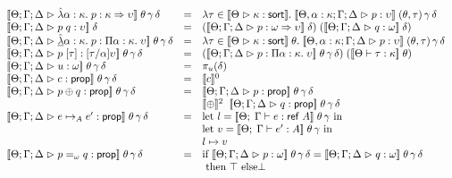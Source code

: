 \begin{figure}
\begin{displaymath}
\begin{array}{lcl}
\interp{\judgeA{\pfun{\alpha}{\kappa}{p}}{\kappa \To \upsilon}}\;\theta\,\gamma\,\delta & = & 
   \semfun{\tau \in \interp{\judgeSort{\kappa}}}
          {\interp{\judgeA[\Theta, \alpha:\kappa;\Gamma;\Delta]{p}{\upsilon}}\;(\theta,\tau)\,\gamma\,\delta} \\

\interp{\judgeA{p\;q}{\upsilon}}\;\delta & = & 
   (\interp{\judgeA{p}{\omega \To \upsilon}}\;\delta)\;(\interp{\judgeA{q}{\omega}}\;\delta) \\

\interp{\judgeA{\pfunall{\alpha}{\kappa}{p}}{\forallsort{\alpha}{\kappa}{\upsilon}}}\;\theta\,\gamma\,\delta & = &
   \semfun{\tau \in \interp{\judgeSort{\kappa}}\;\theta}
          {\interp{\judgeA[\Theta, \alpha:\kappa; \Gamma; \Delta]{p}{\upsilon}}\;(\theta,\tau)\,\gamma\,\delta}
\\
\interp{\judgeA{p\;[\tau]}{[\tau/\alpha]\upsilon}}\;\theta\,\gamma\,\delta & = & 
   (\interp{\judgeA{p}{\forallsort{\alpha}{\kappa}{\upsilon}}}\;\theta\,\gamma\,\delta)\;
   (\interp{\judgeWK{\tau}{\kappa}}\;\theta) \\


\interp{\judgeA{u}{\omega}}\;\theta\,\gamma\,\delta & = & \pi_u(\delta) \\

\interp{\judgeA{c}{\assert}}\;\theta\,\gamma\,\delta & = & \interp{c}^0 \\

\interp{\judgeA{p \oplus q}{\assert}}\;\theta\,\gamma\,\delta & = & 
    \interp{\judgeA{p}{\assert}}\;\theta\,\gamma\,\delta \\
& & \interp{\oplus}^2\;\;\interp{\judgeA{q}{\assert}}\;\theta\,\gamma\,\delta \\

\interp{\judgeA{e \pointsto_A e'}{\assert}}\;\theta\,\gamma\,\delta & = & 
    \mbox{let } l = \interp{\judgeE{\Gamma}{e}{\reftype{A}}}\;\theta\,\gamma \mbox{ in}\\
& & \mbox{let } v = \interp{\judgeE{\Gamma}{e'}{A}}\;\theta\,\gamma \mbox{ in} \\
& & l \pointsto v \\


\interp{\judgeA{p =_\omega q}{\assert}}\;\theta\,\gamma\,\delta & = & 
   \mbox{if }\interp{\judgeA{p}{\omega}}\;\theta\,\gamma\,\delta = \interp{\judgeA{q}{\omega}}\;\theta\,\gamma\,\delta \\
   & & \mbox{ then } \top \mbox{ else} \bot \\


\end{array}
\end{displaymath}
\end{figure}
